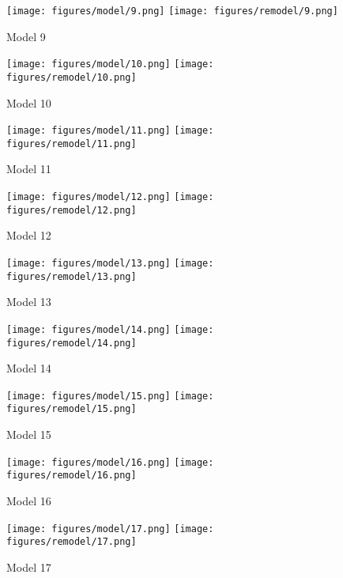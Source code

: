 \begin{figure}
  \centering
  \texttt{[image: figures/model/9.png]}
  \texttt{[image: figures/remodel/9.png]}
  \caption{Model 9}
  \label{fig:model9}
\end{figure}

\begin{figure}
  \centering
  \texttt{[image: figures/model/10.png]}
  \texttt{[image: figures/remodel/10.png]}
  \caption{Model 10}
  \label{fig:model10}
\end{figure}

\begin{figure}
  \centering
  \texttt{[image: figures/model/11.png]}
  \texttt{[image: figures/remodel/11.png]}
  \caption{Model 11}
  \label{fig:model11}
\end{figure}

\begin{figure}
  \centering
  \texttt{[image: figures/model/12.png]}
  \texttt{[image: figures/remodel/12.png]}
  \caption{Model 12}
  \label{fig:model12}
\end{figure}

\begin{figure}
  \centering
  \texttt{[image: figures/model/13.png]}
  \texttt{[image: figures/remodel/13.png]}
  \caption{Model 13}
  \label{fig:model13}
\end{figure}

\begin{figure}
  \centering
  \texttt{[image: figures/model/14.png]}
  \texttt{[image: figures/remodel/14.png]}
  \caption{Model 14}
  \label{fig:model14}
\end{figure}

\begin{figure}
  \centering
  \texttt{[image: figures/model/15.png]}
  \texttt{[image: figures/remodel/15.png]}
  \caption{Model 15}
  \label{fig:model15}
\end{figure}

\begin{figure}
  \centering
  \texttt{[image: figures/model/16.png]}
  \texttt{[image: figures/remodel/16.png]}
  \caption{Model 16}
  \label{fig:model16}
\end{figure}

\begin{figure}
  \centering
  \texttt{[image: figures/model/17.png]}
  \texttt{[image: figures/remodel/17.png]}
  \caption{Model 17}
  \label{fig:model17}
\end{figure}

